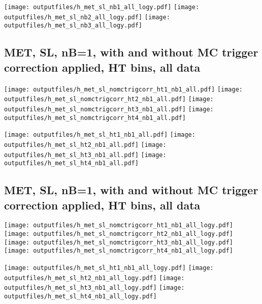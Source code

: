 \documentclass[11pt]{article}
\begin{document}
    \noindent
     \texttt{[image: outputfiles/h\_met\_sl\_nb1\_all\_logy.pdf]}
     \texttt{[image: outputfiles/h\_met\_sl\_nb2\_all\_logy.pdf]}
     \texttt{[image: outputfiles/h\_met\_sl\_nb3\_all\_logy.pdf]}


     \subsection{ MET, SL, nB=1, with and without MC trigger correction applied, HT bins, all data}

    \noindent
     \texttt{[image: outputfiles/h\_met\_sl\_nomctrigcorr\_ht1\_nb1\_all.pdf]}
     \texttt{[image: outputfiles/h\_met\_sl\_nomctrigcorr\_ht2\_nb1\_all.pdf]}
     \texttt{[image: outputfiles/h\_met\_sl\_nomctrigcorr\_ht3\_nb1\_all.pdf]}
     \texttt{[image: outputfiles/h\_met\_sl\_nomctrigcorr\_ht4\_nb1\_all.pdf]}

    \noindent
     \texttt{[image: outputfiles/h\_met\_sl\_ht1\_nb1\_all.pdf]}
     \texttt{[image: outputfiles/h\_met\_sl\_ht2\_nb1\_all.pdf]}
     \texttt{[image: outputfiles/h\_met\_sl\_ht3\_nb1\_all.pdf]}
     \texttt{[image: outputfiles/h\_met\_sl\_ht4\_nb1\_all.pdf]}

    \clearpage
     \subsection{ MET, SL, nB=1, with and without MC trigger correction applied, HT bins, all data}

    \noindent
     \texttt{[image: outputfiles/h\_met\_sl\_nomctrigcorr\_ht1\_nb1\_all\_logy.pdf]}
     \texttt{[image: outputfiles/h\_met\_sl\_nomctrigcorr\_ht2\_nb1\_all\_logy.pdf]}
     \texttt{[image: outputfiles/h\_met\_sl\_nomctrigcorr\_ht3\_nb1\_all\_logy.pdf]}
     \texttt{[image: outputfiles/h\_met\_sl\_nomctrigcorr\_ht4\_nb1\_all\_logy.pdf]}


    \noindent
     \texttt{[image: outputfiles/h\_met\_sl\_ht1\_nb1\_all\_logy.pdf]}
     \texttt{[image: outputfiles/h\_met\_sl\_ht2\_nb1\_all\_logy.pdf]}
     \texttt{[image: outputfiles/h\_met\_sl\_ht3\_nb1\_all\_logy.pdf]}
     \texttt{[image: outputfiles/h\_met\_sl\_ht4\_nb1\_all\_logy.pdf]}
\end{document}
